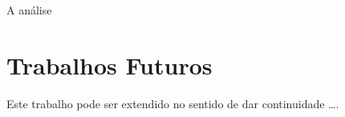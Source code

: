 
\lettrine{A}{} análise 


\section{Trabalhos Futuros}
Este trabalho pode ser extendido no sentido de dar continuidade \dots.




